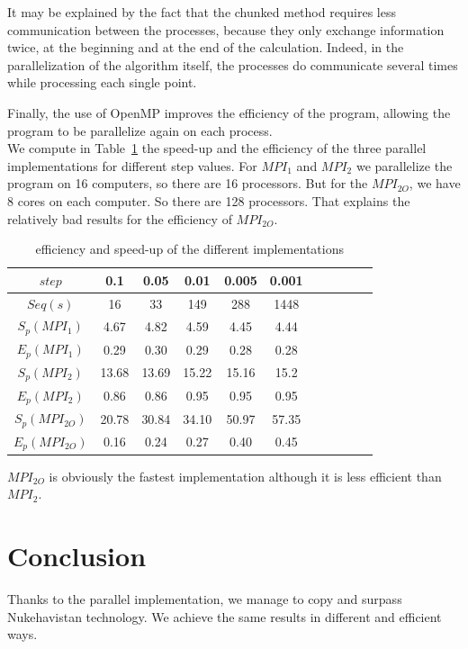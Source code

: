 \documentclass[11pt,a4paper]{article}
\begin{document}
It may be explained by the fact that the chunked method requires less communication between the processes, because they only exchange information twice, at the beginning and at the end of the calculation. Indeed, in the parallelization of the algorithm itself, the processes do communicate several times while processing each single point. 

Finally, the use of OpenMP improves the efficiency of the program, allowing the program to be parallelize again on each process. \\

We compute in Table~\ref{table:efficiency} the speed-up and the efficiency of the three parallel implementations for different step values. For $MPI_1$ and $MPI_2$ we parallelize the program on 16 computers, so there are 16 processors. But for the $MPI_{2O}$, we have 8 cores on each computer. So there are 128 processors. That explains the relatively bad results for the efficiency of $MPI_{2O}$. 

\begin{table}[h]
\centering
\begin{tabular}{|c|c|c|c|c|c|c|c|c|c|c|}
  \hline
  $step$ & 0.1 & 0.05 & 0.01 & 0.005 & 0.001\\ 
  \hline
  $Seq(s)$ & 16 & 33 & 149 & 288 & 1448\\
  \hline
   $S_p(MPI_1)$ & 4.67 & 4.82 & 4.59 & 4.45 & 4.44\\
  \hline
  $E_p(MPI_1)$ & 0.29 & 0.30 & 0.29 & 0.28 & 0.28\\
  \hline
   $S_p(MPI_2)$ & 13.68 & 13.69 & 15.22 & 15.16 & 15.2\\
  \hline
  $E_p(MPI_2)$ & 0.86 & 0.86 & 0.95 & 0.95 & 0.95\\
  \hline
   $S_p(MPI_{2O})$ & 20.78 & 30.84 & 34.10 & 50.97 & 57.35\\
  \hline
  $E_p(MPI_{2O})$ & 0.16 & 0.24 & 0.27 & 0.40 & 0.45\\
  \hline
  \end{tabular}
\caption{\label{table:efficiency} efficiency and speed-up of the different implementations}
\end{table}

$MPI_{2O}$ is obviously the fastest implementation although it is less efficient than $MPI_2$.

\section{Conclusion}
Thanks to the parallel implementation, we manage to copy and surpass Nukehavistan technology. We achieve the same results in different and efficient ways.
\end{document}
